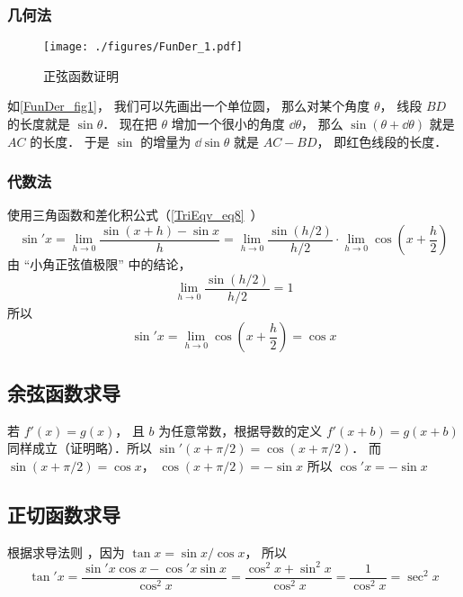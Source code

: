 \subsubsection{几何法}
\begin{figure}[ht]
\centering
\texttt{[image: ./figures/FunDer\_1.pdf]}
\caption{正弦函数证明} \label{FunDer_fig1}
\end{figure}
如\autoref{FunDer_fig1}， 我们可以先画出一个单位圆， 那么对某个角度 $\theta$， 线段 $BD$ 的长度就是 $\sin\theta$． 现在把 $\theta$ 增加一个很小的角度 $\dd{\theta}$， 那么 $\sin(\theta+\dd{\theta})$ 就是 $AC$ 的长度． 于是 $\sin$ 的增量为 $\dd{\sin\theta}$ 就是 $AC - BD$， 即红色线段的长度．


\subsubsection{代数法}
使用三角函数和差化积公式（\autoref{TriEqv_eq8}~）
\begin{equation}
\sin'x = \lim_{h \to 0} \frac{\sin (x + h) - \sin x}{h} = \lim_{h \to 0} \frac{\sin (h/2)}{h/2} \cdot \lim_{h \to 0}\cos( x + \frac{h}{2})
\end{equation}
由 “小角正弦值极限” 中的结论，
\begin{equation}
\lim_{h \to 0} \frac{\sin (h/2)}{h/2} = 1
\end{equation}
所以
\begin{equation}
\sin'x =  \lim_{h \to 0}\cos( x + \frac{h}{2}) = \cos x
\end{equation}

\subsection{余弦函数求导}
若 $f'(x) = g(x)$， 且 $b$ 为任意常数，根据导数的定义 $f'(x + b) = g(x + b)$ 同样成立（证明略）．所以 $\sin'(x + \pi/2) = \cos(x + \pi/2)$． 而 $\sin(x + \pi/2) = \cos x$，  $\cos(x + \pi/2) =  - \sin x$ 所以 $\cos' x =  - \sin x$

\subsection{正切函数求导}
根据求导法则%
，因为 $\tan x = \sin x/\cos x$， 所以
\begin{equation}
\tan' x = \frac{\sin' x \cos x - \cos' x\sin x}{\cos^2 x} = \frac{\cos^2x + \sin^2 x}{\cos^2 x} = \frac{1}{\cos ^2 x} = \sec ^2 x
\end{equation}

